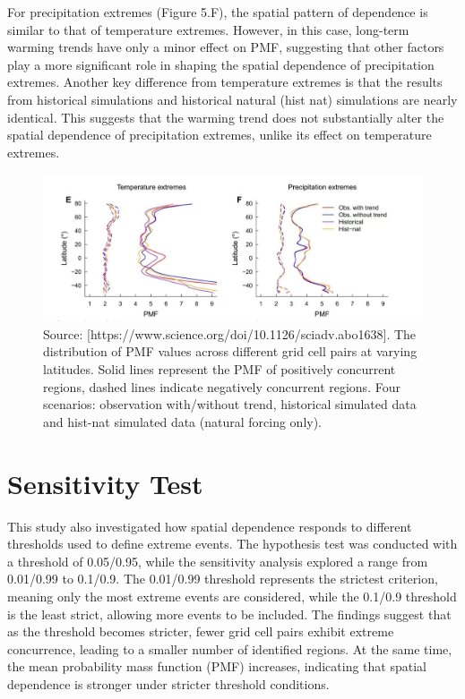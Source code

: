 \documentclass[
]{krantz}
\begin{document}
For precipitation extremes (Figure 5.F), the spatial pattern of dependence is similar to that of temperature extremes. However, in this case, long-term warming trends have only a minor effect on PMF, suggesting that other factors play a more significant role in shaping the spatial dependence of precipitation extremes. Another key difference from temperature extremes is that the results from historical simulations and historical natural (hist nat) simulations are nearly identical. This suggests that the warming trend does not substantially alter the spatial dependence of precipitation extremes, unlike its effect on temperature extremes.

\vspace{1em}
\begin{figure}

{\centering \includegraphics[width=0.8\linewidth]{work/06-anthropo/figures/latitude} 

}

\caption{Source: [https://www.science.org/doi/10.1126/sciadv.abo1638]. The distribution of PMF values across different grid cell pairs at varying latitudes. Solid lines represent the PMF of positively concurrent regions, dashed lines indicate negatively concurrent regions. Four scenarios: observation with/without trend, historical simulated data and hist-nat simulated data (natural forcing only).}\label{fig:unnamed-chunk-9}
\end{figure}
\vspace{1em}

\section{Sensitivity Test}\label{sensitivity-test}

This study also investigated how spatial dependence responds to different thresholds used to define extreme events. The hypothesis test was conducted with a threshold of 0.05/0.95, while the sensitivity analysis explored a range from 0.01/0.99 to 0.1/0.9. The 0.01/0.99 threshold represents the strictest criterion, meaning only the most extreme events are considered, while the 0.1/0.9 threshold is the least strict, allowing more events to be included. The findings suggest that as the threshold becomes stricter, fewer grid cell pairs exhibit extreme concurrence, leading to a smaller number of identified regions. At the same time, the mean probability mass function (PMF) increases, indicating that spatial dependence is stronger under stricter threshold conditions.
\end{document}
